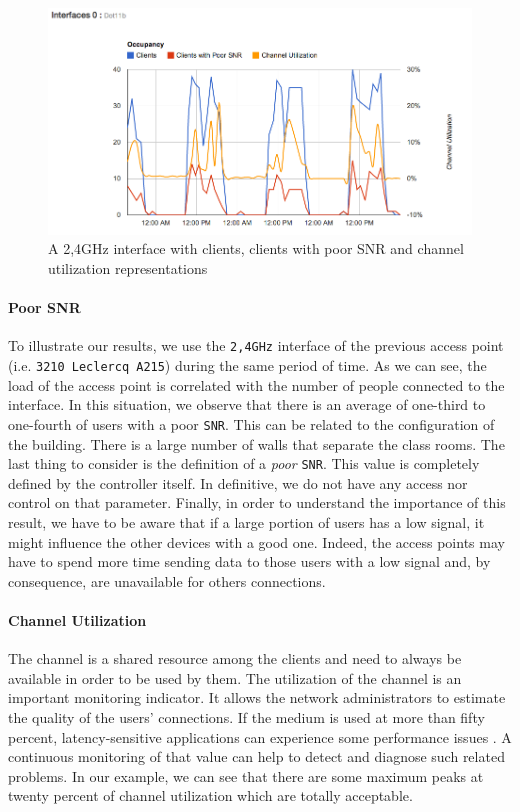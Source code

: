 \begin{figure}[H]
   \includegraphics[width=\textwidth]{Pictures/chapter5/interfaceLoad.png}
   \caption{A 2,4GHz interface with clients, clients with poor SNR and channel utilization representations}
\end{figure}

\paragraph*{Poor SNR} To illustrate our results, we use the \texttt{2,4GHz} interface of the previous access point (i.e. \texttt{3210 Leclercq A215}) during the same period of time. As we can see, the load of the access point is correlated with the number of people connected to the interface. In this situation, we observe that there is an average of one-third to one-fourth of users with a poor \texttt{SNR}. This can be related to the configuration of the building. There is a large number of walls that separate the class rooms. The last thing to consider is the definition of a \emph{poor} \texttt{SNR}. This value is completely defined by the controller itself. In definitive, we do not have any access nor control on that parameter. Finally, in order to understand the importance of this result, we have to be aware that if a large portion of users has a low signal, it might influence the other devices with a good one. Indeed, the access points may have to spend more time sending data to those users with a low signal and, by consequence, are unavailable for others connections.

\paragraph*{Channel Utilization} The channel is a shared resource among the clients and need to always be available in order to be used by them. The utilization of the channel is an important monitoring indicator. It allows the network administrators to estimate the quality of the users' connections. If the medium is used at more than fifty percent, latency-sensitive applications can experience some performance issues \cite{ciscoVowlan}. A continuous monitoring of that value can help to detect and diagnose such related problems. In our example, we can see that there are some maximum peaks at twenty percent of channel utilization which are totally acceptable. 


